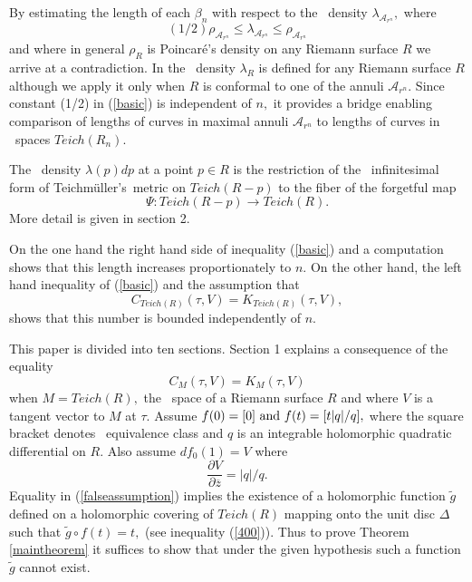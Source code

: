 \documentclass[12pt]{amsart}
\newcommand{\tes}{Teich\-m\"ul\-ler's}
\theoremstyle{remark}
\theoremstyle{definition}
\theoremstyle{definition}
\begin{document}
\begin{section}
    
By estimating the length of each $\beta_n$ with respect to the \te\ density 
$\lambda_{{\mathcal A}_{r^n}},$ where 
 \begin{equation}\label{basic} (1/2) \rho_{{\mathcal A}_{r^n}} \leq \lambda_{{\mathcal A}_{r^n}} \leq \rho_{{\mathcal A}_{r^n}}
 \end{equation} and where in general $\rho_R$ is Poincar\'e's density on any Riemann surface $R$ we arrive at a contradiction.  
 In \cite{GardinerLakic3} the \te\ density $\lambda_R$ is defined for any Riemann surface $R$ although we apply it only when  $R$ is conformal to one of the annuli ${\mathcal A}_{r^n}.$  Since constant (1/2) in  (\ref{basic})  is independent of $n,$  it  provides a bridge enabling  comparison of  lengths of  curves in maximal annuli ${\mathcal A}_{r^n}$ to lengths of curves in \te\ spaces $Teich(R_n).$
 
 \bigskip
 
 The \te\ density  $\lambda(p)dp$ at a point $p \in R$ is the restriction of the \te\ infinitesimal form of  \tes\ metric on $Teich(R-p)$ to the fiber of the forgetful map
 $$\Psi : Teich(R-p) \rightarrow Teich(R).$$  More detail is given in section 2. 
 
  On the one hand the right hand side of  inequality (\ref{basic}) and a computation shows that this length increases  proportionately to
 $n.$    On the other hand, the left hand inequality of (\ref{basic})  and the assumption that
           \begin{equation}\label{falseassumption} C_{Teich(R)}(\tau, V) = K_{Teich(R)}(\tau,V), \end{equation} shows that this number is bounded independently of $n.$
            
  
   
   This paper is divided into ten sections.  Section 1 explains a consequence 
   of the equality $$C_M(\tau,V)=K_M(\tau,V)$$ when $M=Teich(R),$ the \te\ space of a 
   Riemann surface $R$ and where  $V$ is a tangent vector to $M$ at $\tau.$  Assume $f(0) = [0] {\rm \ and \ } f(t)=[t|q|/q],$ where the square bracket 
   denotes \te\ equivalence class and $q$ is an integrable holomorphic quadratic differential on  $R.$  Also assume $df_0(1)=V$ where 
   $$\frac{\partial V}{\partial \overline{z}}= |q|/q.$$
    Equality in (\ref{falseassumption}) implies the existence of a holomorphic function $\tilde{g}$ 
   defined on a holomorphic covering of $Teich(R)$ mapping onto the unit disc $\Delta$  such that $\tilde{g} \circ f (t) =t,$ (see inequality (\ref{400})). Thus to prove Theorem \ref{maintheorem} it suffices  to show that under the given hypothesis such a function $\tilde{g}$ cannot exist.
   

\end{section}
\end{document}
